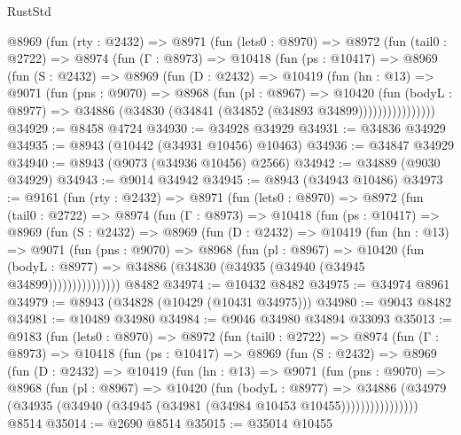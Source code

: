 \begin{lexlean}{RustStd}
\begin{coremodule}
    @8969
      (fun (rty : @2432) =>
      @8971
        (fun (lets0 : @8970) =>
        @8972
          (fun (tail0 : @2722) =>
          @8974
            (fun (Γ : @8973) =>
            @10418
              (fun (ps : @10417) =>
              @8969
                (fun (S : @2432) =>
                @8969
                  (fun (D : @2432) =>
                  @10419
                    (fun (hn : @13) =>
                    @9071
                      (fun (pns : @9070) =>
                      @8968
                        (fun (pl : @8967) =>
                        @10420
                          (fun (bodyL : @8977) =>
                          @34886 (@34830 (@34841 (@34852 (@34893 @34899))))))))))))))))
@34929 := @8458 @4724
@34930 := @34928 @34929
@34931 := @34836 @34929
@34935 := @8943 (@10442 (@34931 @10456) @10463)
@34936 := @34847 @34929
@34940 := @8943 (@9073 (@34936 @10456) @2566)
@34942 := @34889 (@9030 @34929)
@34943 := @9014 @34942
@34945 := @8943 (@34943 @10486)
@34973 := @9161
    (fun (rty : @2432) =>
    @8971
      (fun (lets0 : @8970) =>
      @8972
        (fun (tail0 : @2722) =>
        @8974
          (fun (Γ : @8973) =>
          @10418
            (fun (ps : @10417) =>
            @8969
              (fun (S : @2432) =>
              @8969
                (fun (D : @2432) =>
                @10419
                  (fun (hn : @13) =>
                  @9071
                    (fun (pns : @9070) =>
                    @8968
                      (fun (pl : @8967) =>
                      @10420
                        (fun (bodyL : @8977) =>
                        @34886 (@34830 (@34935 (@34940 (@34945 @34899)))))))))))))))
    @8482
@34974 := @10432 @8482
@34975 := @34974 @8961
@34979 := @8943 (@34828 (@10429 (@10431 @34975)))
@34980 := @9043 @8482
@34981 := @10489 @34980
@34984 := @9046 @34980 @34894 @33093
@35013 := @9183
    (fun (lets0 : @8970) =>
    @8972
      (fun (tail0 : @2722) =>
      @8974
        (fun (Γ : @8973) =>
        @10418
          (fun (ps : @10417) =>
          @8969
            (fun (S : @2432) =>
            @8969
              (fun (D : @2432) =>
              @10419
                (fun (hn : @13) =>
                @9071
                  (fun (pns : @9070) =>
                  @8968
                    (fun (pl : @8967) =>
                    @10420
                      (fun (bodyL : @8977) =>
                      @34886
                        (@34979
                          (@34935 (@34940 (@34945 (@34981 (@34984 @10453 @10455))))))))))))))))
    @8514
@35014 := @2690 @8514
@35015 := @35014 @10455

\end{coremodule}
\end{lexlean}
